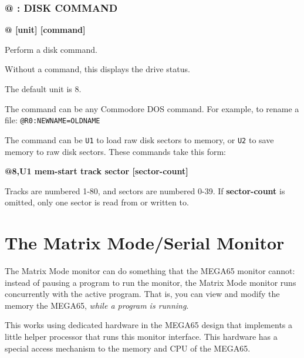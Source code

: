 \subsubsection{@ : DISK COMMAND}
\begin{description}[leftmargin=2cm,style=nextline]
\item [Format:] {\bf @ [unit] [command]}
\item [Usage:] Perform a disk command.

\item [Remarks:] Without a command, this displays the drive status.

    The default unit is 8.

    The command can be any Commodore DOS command. For example, to rename a file: {\tt @R0:NEWNAME=OLDNAME}

    The command can be {\tt U1} to load raw disk sectors to memory, or {\tt U2} to save memory to raw disk sectors. These commands take this form:

    {\bf @8,U1 mem-start track sector [sector-count]}

    Tracks are numbered 1-80, and sectors are numbered 0-39. If {\bf sector-count} is omitted, only one sector is read from or written to.

\end{description}



\section{The Matrix Mode/Serial Monitor}
\label{sec:matrix-mode}

The Matrix Mode monitor can do something that the MEGA65 monitor cannot: instead of pausing a program to run the monitor, the Matrix Mode monitor runs concurrently with the active program. That is, you can view and modify the memory the MEGA65, {\em while a program is running}.

This works using dedicated hardware in the MEGA65 design that implements a little
helper processor that runs this monitor interface. This hardware has a special access mechanism
to the memory and CPU of the MEGA65.

